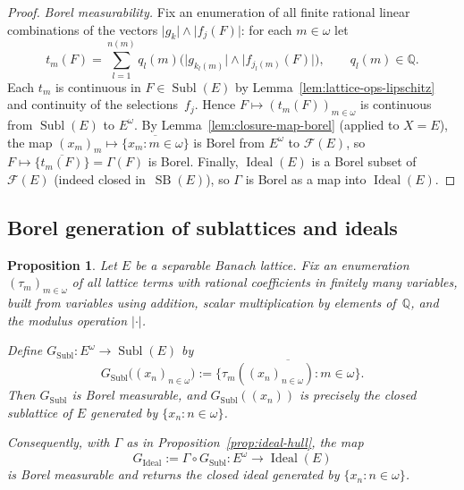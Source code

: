 \documentclass[12pt]{amsart}
\theoremstyle{plain}
\newtheorem{proposition}[theorem]{Proposition}
\theoremstyle{definition}
\theoremstyle{remark}
\DeclareMathOperator{\SB}{SB}
\DeclareMathOperator{\Subl}{Subl}
\DeclareMathOperator{\Ideal}{Ideal}
\newcommand{\bbQ}{\mathbb{Q}}
\begin{document}
\begin{proof}
\medskip
\emph{Borel measurability.}
Fix an enumeration of all finite rational linear combinations of the vectors
$\lvert g_k \rvert \wedge \lvert f_j(F) \rvert$: for each $m \in \omega$ let
\[
    t_m(F) = \sum_{l=1}^{n(m)} q_l(m)
    \bigl(\lvert g_{k_l(m)} \rvert \wedge \lvert f_{j_l(m)}(F) \rvert\bigr),
    \qquad q_l(m) \in \bbQ.
\]
Each $t_m$ is continuous in $F \in \Subl(E)$ by
Lemma~\ref{lem:lattice-ops-lipschitz} and continuity of the selections~$f_j$.
Hence $F \mapsto (t_m(F))_{m \in \omega}$ is continuous from $\Subl(E)$ to
$E^\omega$.  By Lemma~\ref{lem:closure-map-borel} (applied to $X = E$), the
map $(x_m)_m \mapsto \overline{\{x_m \colon m \in \omega\}}$ is Borel from
$E^\omega$ to $\mathcal{F}(E)$, so
$F \mapsto \overline{\{t_m(F)\}} = \Gamma(F)$ is Borel.  Finally,
$\Ideal(E)$ is a Borel subset of $\mathcal{F}(E)$ (indeed closed
in~$\SB(E)$), so $\Gamma$ is Borel as a map into $\Ideal(E)$.
\end{proof}

\subsection{Borel generation of sublattices and ideals}\label{subsec:borel-gen}

\begin{proposition}\label{prop:borel-generated-sublattice}
Let $E$ be a separable Banach lattice.  Fix an enumeration
$(\tau_m)_{m \in \omega}$ of all \emph{lattice terms with rational coefficients}
in finitely many variables, built from variables using addition, scalar
multiplication by elements of~$\bbQ$, and the modulus operation $\lvert\cdot\rvert$.

Define $G_{\Subl} \colon E^\omega \to \Subl(E)$ by
\[
    G_{\Subl}\bigl((x_n)_{n \in \omega}\bigr)
    := \overline{\{\tau_m((x_n)_{n \in \omega}) \colon m \in \omega\}}.
\]
Then $G_{\Subl}$ is Borel measurable, and $G_{\Subl}((x_n))$ is precisely the
closed sublattice of $E$ generated by $\{x_n \colon n \in \omega\}$.

Consequently, with $\Gamma$ as in Proposition~\ref{prop:ideal-hull}, the map
\[
    G_{\Ideal} := \Gamma \circ G_{\Subl}
    \colon E^\omega \to \Ideal(E)
\]
is Borel measurable and returns the closed ideal generated by
$\{x_n \colon n \in \omega\}$.
\end{proposition}
\end{document}
